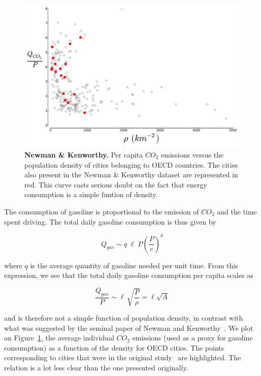 \begin{figure}
    \centering
    \includegraphics[width=\textwidth]{gfx/chapter-scaling/newman_kenworthy.pdf}
    \caption{{\bf Newman \& Kenworthy.} Per capita $CO_2$ emissions versus the population density of cities
    belonging to OECD countries. The cities also present in the Newman \&
    Kenworthy dataset are represented in red. This curve casts serious doubt on
the fact that energy consumption is a simple funtion of
density.\label{fig:newman_kenworthy}}
\end{figure}

The consumption of gasoline is proportional to the emission of $CO_2$ and the time spent driving.
The total daily gasoline consumption is thus given by

\begin{equation} 
    Q_{gas} \sim q\; \ell\; P \left(\frac{P}{c}\right)^{\delta}
\end{equation}

where $q$ is the average quantity of gasoline needed per unit time. From this
expression, we see that the total daily gasoline consumption per capita scales
as

\begin{equation} 
    \frac{Q_{gas}}{P}\sim \ell\, \sqrt{\frac{P}{\rho}} = \ell
\sqrt{A} 
    \label{eq:nk_area}
\end{equation}

and is therefore not a simple function of population density, in contrast with
what was suggested by the seminal paper of Newman and
Kenworthy~\cite{Newman:1989}. We plot on Figure~\ref{fig:newman_kenworthy},  the average individual $CO_2$ emissions (used as a proxy for gasoline
consumption) as a function of the density for OECD cities. The points
corresponding to cities that were in the original study~\cite{Newman:1989} are
highlighted. The relation is a lot less clear than the one presented originally.  


